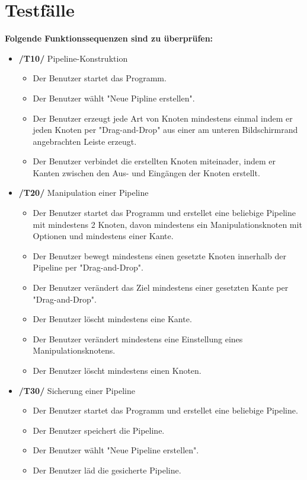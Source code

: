 \section{Testfälle}

\textbf{Folgende Funktionssequenzen sind zu überprüfen:}
\begin{itemize}
	\item\textbf{/T10/} Pipeline-Konstruktion
		\begin{itemize}
			\item Der Benutzer startet das Programm.
			\item Der Benutzer wählt "Neue Pipline erstellen".
			\item Der Benutzer erzeugt jede Art von Knoten mindestens einmal indem er jeden Knoten per "Drag-and-Drop" aus einer am unteren Bildschirmrand
				angebrachten Leiste erzeugt.
			\item Der Benutzer verbindet die erstellten Knoten miteinader, indem er Kanten zwischen den Aus- und Eingängen der Knoten erstellt.
		\end{itemize}
	\item\textbf{/T20/} Manipulation einer Pipeline
		\begin{itemize}
			\item Der Benutzer startet das Programm und erstellet eine beliebige Pipeline mit mindestens 2 Knoten, davon mindestens ein Manipulationsknoten mit Optionen 
				und mindestens einer Kante.
			\item Der Benutzer bewegt mindestens einen gesetzte Knoten innerhalb der Pipeline per "Drag-and-Drop".
			\item Der Benutzer verändert das Ziel mindestens einer gesetzten Kante per "Drag-and-Drop".
			\item Der Benutzer löscht mindestens eine Kante.
			\item Der Benutzer verändert mindestens eine Einstellung eines Manipulationsknotens.
			\item Der Benutzer löscht mindestens einen Knoten.
		\end{itemize}
	\item\textbf{/T30/} Sicherung einer Pipeline
		\begin{itemize}
			\item Der Benutzer startet das Programm und erstellet eine beliebige Pipeline.
			\item Der Benutzer speichert die Pipeline.
			\item Der Benutzer wählt "Neue Pipeline erstellen".
			\item Der Benutzer läd die gesicherte Pipeline.

\end{itemize}
\end{itemize}
